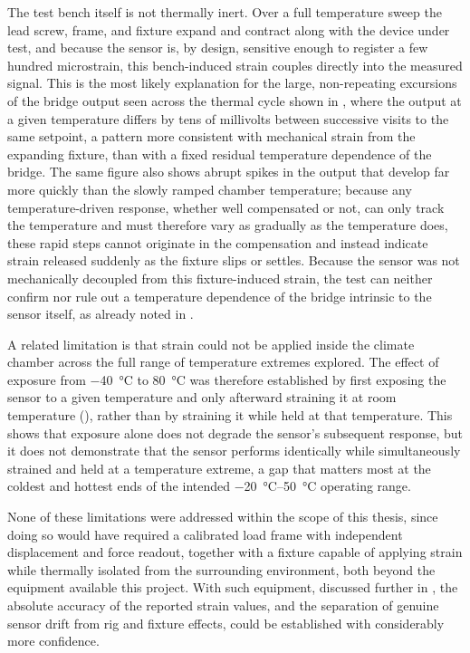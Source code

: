 The test bench itself is not thermally inert. Over a full temperature sweep the lead screw, frame, and fixture expand and contract along with the device under test, and because the sensor is, by design, sensitive enough to register a few hundred microstrain, this bench-induced strain couples directly into the measured signal. This is the most likely explanation for the large, non-repeating excursions of the bridge output seen across the thermal cycle shown in , where the output at a given temperature differs by tens of millivolts between successive visits to the same setpoint, a pattern more consistent with mechanical strain from the expanding fixture, than with a fixed residual temperature dependence of the bridge. The same figure also shows abrupt spikes in the output that develop far more quickly than the slowly ramped chamber temperature; because any temperature-driven response, whether well compensated or not, can only track the temperature and must therefore vary as gradually as the temperature does, these rapid steps cannot originate in the compensation and instead indicate strain released suddenly as the fixture slips or settles. 
Because the sensor was not mechanically decoupled from this fixture-induced strain, the test can neither confirm nor rule out a temperature dependence of the bridge intrinsic to the sensor itself, as already noted in .

A related limitation is that strain could not be applied inside the climate chamber across the full range of temperature extremes explored. The effect of exposure from \SI{-40}{\celsius} to \SI{80}{\celsius} was therefore established by first exposing the sensor to a given temperature and only afterward straining it at room temperature (), rather than by straining it while held at that temperature. This shows that exposure alone does not degrade the sensor's subsequent response, but it does not demonstrate that the sensor performs identically while simultaneously strained and held at a temperature extreme, a gap that matters most at the coldest and hottest ends of the intended \SIrange{-20}{50}{\celsius} operating range.

None of these limitations were addressed within the scope of this thesis, since doing so would have required a calibrated load frame with independent displacement and force readout, together with a fixture capable of applying strain while thermally isolated from the surrounding environment, both beyond the equipment available this project. With such equipment, discussed further in , the absolute accuracy of the reported strain values, and the separation of genuine sensor drift from rig and fixture effects, could be established with considerably more confidence.

